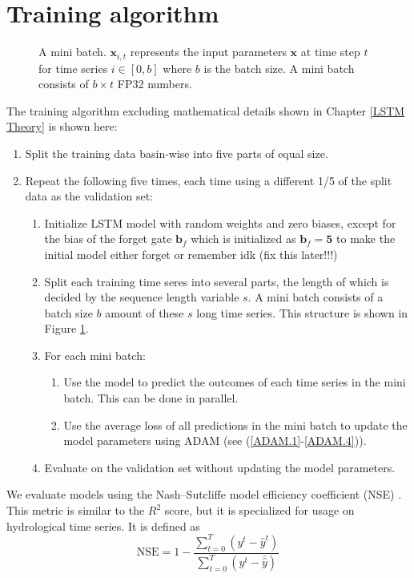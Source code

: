 \section{Training algorithm}
\begin{figure}
\centering

    \caption[A mini batch.]{A mini batch. $\bm{x}_{i,t}$ represents the input parameters $\bm{x}$ at time step $t$ for time series $i \in [0, b]$ where $b$ is the batch size. A mini batch consists of $b \times t$ FP32 numbers.}
\label{mini batch}
\end{figure}
The training algorithm excluding mathematical details shown in Chapter \ref{LSTM Theory} 
is shown here:
\begin{enumerate}
    \item Split the training data basin-wise into five parts of equal size.
    \item Repeat the following five times, each time using a different 1/5 of the 
        split data as the validation set: \begin{enumerate}
            \item Initialize LSTM model with random weights and zero biases, except for the bias of the forget gate $\bm{b}_f$ which is initialized as $\bm{b}_f=\bm{5}$ to make the initial model either forget or remember idk (fix this later!!!) \citationneeded
        \item Split each training time seres into several parts, the length 
            of which is decided by the sequence length variable $s$. A mini batch 
            consists of a batch size $b$ amount of these $s$ long time series. This 
                structure is shown in Figure \ref{mini batch}.
        \item For each mini batch:
        \begin{enumerate}
            \item Use the model to predict the outcomes of each time series in the 
                mini batch. This can be done in parallel.
            \item Use the average loss of all predictions in the mini batch to update 
                the model parameters using ADAM (see (\ref{ADAM.1}-\ref{ADAM.4})).
        \end{enumerate}
        \item Evaluate on the validation set without updating the model parameters.
    \end{enumerate}
\end{enumerate}
We evaluate models using the Nash–Sutcliffe model efficiency coefficient (NSE) \citep{NSE}.
This metric is similar to the $R^2$ score, but it is specialized for usage 
on hydrological time series.
It is defined as 
\begin{equation}
    \text{NSE} = 1 - \frac{\sum_{t=0}^T\left( y^t - \hat{y}^t\right)}{\sum_{t=0}^T\left(y^t - \bar{\hat{y}}\right)} \label{NSE}
\end{equation}

